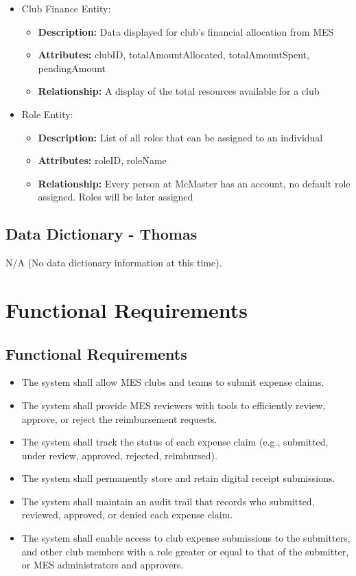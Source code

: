 \documentclass[12pt]{article}
\begin{document}
\begin{itemize}
    \item Club Finance Entity:
      \begin{itemize}
          \item \textbf{Description:} Data displayed for club's financial allocation from MES
          \item \textbf{Attributes:} clubID, totalAmountAllocated, totalAmountSpent, pendingAmount
          \item \textbf{Relationship:} A display of the total resources available for a club 
        \end{itemize}

    \item Role Entity:
      \begin{itemize}
          \item \textbf{Description:} List of all roles that can be assigned to an individual
          \item \textbf{Attributes:} roleID, roleName
          \item \textbf{Relationship:} Every person at McMaster has an account, no default role assigned. Roles will be later assigned
        \end{itemize}
  \end{itemize}
  \subsection{Data Dictionary - Thomas}
  N/A (No data dictionary information at this time).

\section{Functional Requirements}
  \subsection{Functional Requirements}
    \begin{itemize}
      \item The system shall allow MES clubs and teams to submit expense claims.
      \item The system shall provide MES reviewers with tools to efficiently review, approve, or reject the reimbursement requests.
      \item The system shall track the status of each expense claim (e.g., submitted, under review, approved, rejected, reimbursed).
      \item The system shall permanently store and retain digital receipt submissions.
      \item The system shall maintain an audit trail that records who submitted, reviewed, approved, or denied each expense claim.
      \item The system shall enable access to club expense submissions to the submitters, and other club members with a role greater or equal to that of the submitter, or MES administrators and approvers.
    \end{itemize}
\end{document}

